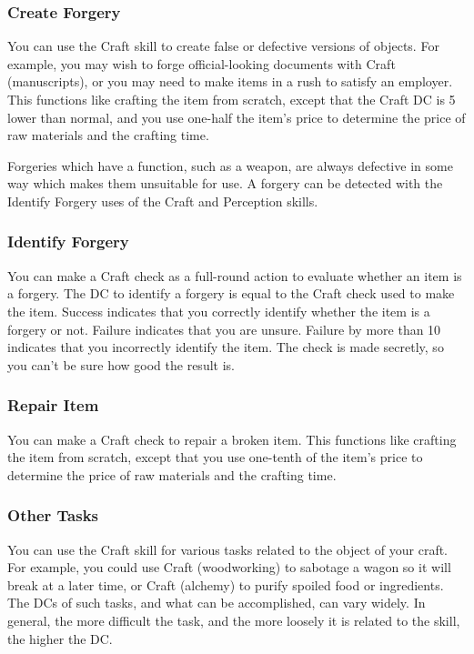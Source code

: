\subsubsection{Create Forgery}
You can use the Craft skill to create false or defective versions of objects. For example, you may wish to forge official-looking documents with Craft (manuscripts), or you may need to make items in a rush to satisfy an employer. This functions like crafting the item from scratch, except that the Craft DC is 5 lower than normal, and you use one-half the item's price to determine the price of raw materials and the crafting time.

Forgeries which have a function, such as a weapon, are always defective in some way which makes them unsuitable for use. A forgery can be detected with the Identify Forgery uses of the Craft and Perception skills.

\subsubsection{Identify Forgery}
You can make a Craft check as a full-round action to evaluate whether an item is a forgery. The DC to identify a forgery is equal to the Craft check used to make the item. Success indicates that you correctly identify whether the item is a forgery or not. Failure indicates that you are unsure. Failure by more than 10 indicates that you incorrectly identify the item. The check is made secretly, so you can't be sure how good the result is.

\subsubsection{Repair Item}
You can make a Craft check to repair a broken item. This functions like crafting the item from scratch, except that you use one-tenth of the item's price to determine the price of raw materials and the crafting time.

\subsubsection{Other Tasks}
You can use the Craft skill for various tasks related to the object of your craft. For example, you could use Craft (woodworking) to sabotage a wagon so it will break at a later time, or Craft (alchemy) to purify spoiled food or ingredients. The DCs of such tasks, and what can be accomplished, can vary widely. In general, the more difficult the task, and the more loosely it is related to the skill, the higher the DC.

